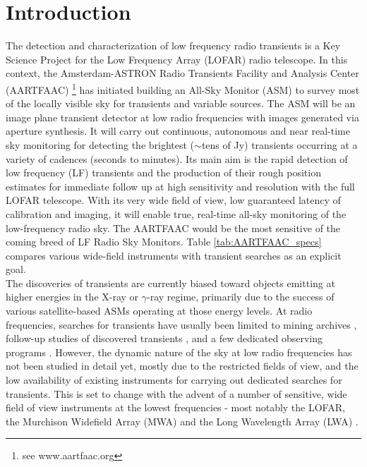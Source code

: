 \documentclass[referee]{aa}
\begin{document}
\section{\label{sec:Introduction}Introduction}
The detection  and characterization of low  frequency radio transients  is a Key
Science  Project \citep{fender2006lofar}  for  the Low  Frequency Array  (LOFAR)
\citep{vanhaarlem2013lofar}   radio    telescope.    In   this    context,   the
Amsterdam-ASTRON    Radio    Transients    Facility    and    Analysis    Center
(AARTFAAC) \footnote{see  www.aartfaac.org }  has initiated building  an All-Sky
Monitor  (ASM) to  survey most  of the  locally visible  sky for  transients and
variable sources.   The ASM  will be  an image plane  transient detector  at low
radio frequencies with  images generated via aperture synthesis.   It will carry
out continuous, autonomous  and near real-time sky monitoring  for detecting the
brightest  ($\sim$tens of  Jy) transients  occurring  at a  variety of  cadences
(seconds to minutes). Its main aim  is the rapid detection of low frequency (LF)
transients and  the production of  their rough position estimates  for immediate
follow up at high sensitivity and resolution with the full LOFAR telescope. With
its very wide field of view,  low guaranteed latency of calibration and imaging,
it will  enable true,  real-time all-sky monitoring  of the  low-frequency radio
sky. The AARTFAAC  would be the most  sensitive of the coming breed  of LF Radio
Sky  Monitors.   Table   \ref{tab:AARTFAAC_specs}  compares  various  wide-field
instruments with transient searches as an explicit goal.\\

The discoveries of  transients are currently biased toward  objects emitting at
higher  energies in  the X-ray  or $\gamma$-ray  regime, primarily  due  to the
success of  various satellite-based ASMs operating  at those energy  levels. At
radio frequencies, searches  for transients have usually been  limited to mining
archives \citep{bower2007submillijansky,  bower2011search}, follow-up studies of
discovered  transients \citep{chandra2012radio}, and  a few  dedicated observing
programs  \citep{bannister2012limits,  katz2003survey}.   However,  the  dynamic
nature of the sky  at low radio frequencies has not been  studied in detail yet,
mostly  due to  the  restricted fields  of  view, and  the  low availability  of
existing instruments  for carrying out dedicated searches  for transients.  This
is set to  change with the advent of  a number of sensitive, wide  field of view
instruments at  the lowest  frequencies - most notably  the LOFAR,  the Murchison
Widefield  Array  (MWA) \citep{lonsdale2009murchison}  and  the Long  Wavelength
Array (LWA) \citep{ellingson2009long}.
\end{document}

